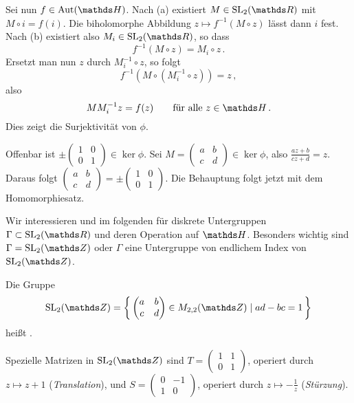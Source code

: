 \begin{bewe-list}
Sei nun $f\in\Aut(\HH)$.
Nach (a) existiert $M\in\SL_2(\RR)$ mit $M\circ i = f(i)$.
Die biholomorphe Abbildung $z\mapsto f^{-1}(M\circ z)$ lässt dann $i$ fest.
Nach (b) existiert also $M_i \in \SL_2(\RR)$, so dass
\[
	f^{-1}(M \circ z) = M_i \circ z
	\,.
\]
Ersetzt man nun $z$ durch $M_i^{-1} \circ z$, so folgt
\[
	f^{-1}(M \circ (M_i^{-1} \circ z))
	= z
	\,,
\]
also
\[
	MM_i^{-1}z = f(z)
	\qquad \text{für alle } z \in \HH
	\,.
\]
Dies zeigt die Surjektivität von $\phi$.

Offenbar ist $\pm (\begin{smallmatrix} 1 & 0\\ 0 & 1\end{smallmatrix}) \in \ker \phi$.
Sei $M = (\begin{smallmatrix} a & b\\ c & d\end{smallmatrix}) \in \ker \phi$, also $\frac{az+b}{cz+d} = z$.
Daraus folgt $(\begin{smallmatrix} a & b\\ c & d\end{smallmatrix}) = \pm (\begin{smallmatrix} 1 & 0\\ 0 & 1\end{smallmatrix})$.
Die Behauptung folgt jetzt mit dem Homomorphiesatz.
\end{bewe-list}

Wir interessieren und im folgenden für diskrete Untergruppen $\Gamma \subset \SL_2(\RR)$ und deren Operation auf $\HH$.
Besonders wichtig sind $\Gamma = \SL_2(\ZZ)$ oder $\Gamma$ eine Untergruppe von endlichem Index von $\SL_2(\ZZ)$.

\begin{defi}
Die Gruppe
\[
	\SL_2(\ZZ) = \Set{ \begin{pmatrix} a & b \\ c& d\end{pmatrix} \in M_{2,2}(\ZZ) \mid ad-bc = 1}
\]
heißt .

Spezielle Matrizen in $\SL_2(\ZZ)$ sind $T = (\begin{smallmatrix} 1 & 1 \\ 0 & 1\end{smallmatrix})$, operiert durch $z \mapsto z + 1$ (\emph{Translation}), und $S = (\begin{smallmatrix} 0 & -1 \\ 1 & 0\end{smallmatrix})$, operiert durch $z \mapsto -\frac{1}{z}$ (\emph{Stürzung}).
\end{defi}

